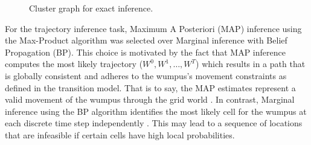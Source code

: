 \documentclass[10pt]{article}
\begin{document}
\begin{figure}[htbp]
    \centering
    \caption{Cluster graph for exact inference.}
    \label{fig:optimized_jt}
\end{figure}

For the trajectory inference task, Maximum A Posteriori (MAP) inference using the Max-Product algorithm was selected over Marginal inference with Belief Propagation (BP). 
This choice is motivated by the fact that MAP inference computes the most likely trajectory ($W^0, W^1, \dots, W^T$) which results in a path that is globally consistent and adheres to 
the wumpus's movement constraints as defined in the transition model. That is to say, the MAP estimates represent a valid movement of the wumpus through the grid world \cite{dupreez2026MAP}. In contrast, Marginal inference using 
the BP algorithm identifies the most likely cell for the wumpus at each discrete time step independently \cite{dupreez2026BP}. This may lead to a sequence of locations that are infeasible if certain cells have 
high local probabilities.
\end{document}
